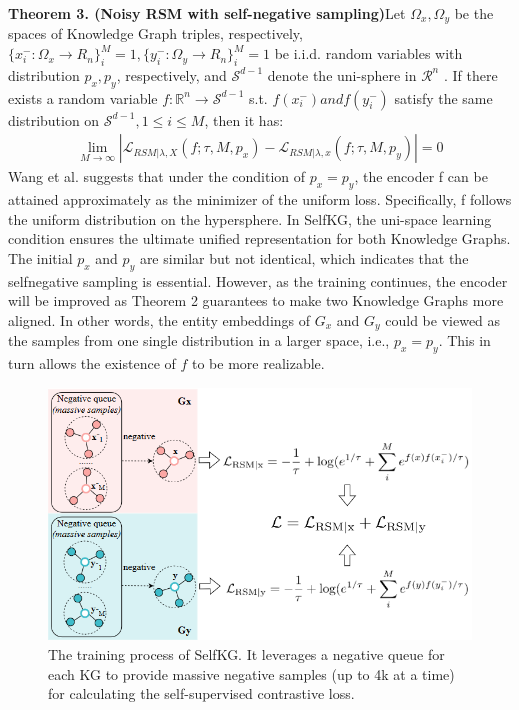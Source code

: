 \documentclass[sigconf]{acmart}
\begin{document}
{\textbf{Theorem 3. (Noisy RSM with self-negative sampling)}Let $\Omega_x, \Omega_y$ be the spaces of Knowledge Graph triples, respectively, $\{x_i^-:\Omega_x \to R_n \}_i^M=1, \{y_i^-:\Omega_y \to R_n \}^M_i=1$ be i.i.d. random variables with distribution $p_x, p_y$, respectively, and $\mathcal{S}^{d - 1}$ denote the uni-sphere in $\mathcal{R}^n$ . If there exists a random variable $f:\mathbb{R}^n \to \mathcal{S}^{d-1}$ s.t. $f(x_i^-) and f(y_i^-)$ satisfy the same distribution on $\mathcal{S}^{d-1}, 1 \le i \le M$, then it has:
\begin{gather}
    \lim_{M \to \infty }|\mathcal{L}_{RSM|\lambda ,X}(f;\tau ,M,p_x) - \mathcal{L}_{RSM|\lambda ,x}(f;\tau ,M,p_y)|=0
\end{gather}
Wang et al. \cite{wang2020understanding} suggests that under the condition of $p_x = p_y$, the encoder f can be attained approximately as the minimizer of the uniform loss. Specifically, f follows the uniform distribution on the hypersphere. In SelfKG, the uni-space learning condition ensures the ultimate unified representation for both Knowledge Graphs. The initial $p_x$ and $p_y$ are similar but not identical, which indicates that the selfnegative sampling is essential. However, as the training continues, the encoder will be improved as Theorem 2 guarantees to make two Knowledge Graphs more aligned. In other words, the entity embeddings of $G_x$ and $G_y$ could be viewed as the samples from one single distribution in a larger space, i.e., $p_x = p_y$. This in turn allows the existence of $f$ to be more realizable.
\begin{figure}
    \centering
    \includegraphics[width = 1\linewidth]{figure/3.png}
    \caption{The training process of SelfKG. It leverages a negative queue for each KG to provide massive negative samples (up to 4k at a time) for calculating the self-supervised contrastive loss.}

\end{figure}}
\end{document}
